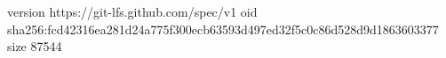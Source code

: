 version https://git-lfs.github.com/spec/v1
oid sha256:fcd42316ea281d24a775f300ecb63593d497ed32f5c0c86d528d9d1863603377
size 87544
